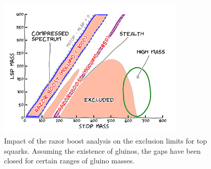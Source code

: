\begin{figure}
  \centering
  \includegraphics[width=0.8\textwidth]{figures/razor_interpretation/story_boost}
  \caption{Impact of the razor boost analysis on the exclusion limits for top squarks. Assuming
the existence of gluinos, the gaps have been closed for certain ranges of gluino masses. 
  \label{fig:boost_story_final}}
\end{figure} 
